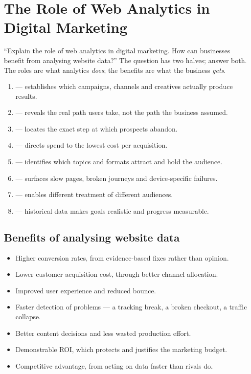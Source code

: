 \documentclass{MMTextbook}
\begin{document}
\section{The Role of Web Analytics in Digital Marketing}

\begin{keybox}
``Explain the role of web analytics in digital marketing. How can businesses
benefit from analysing website data?''
The question has two halves; answer both. The roles are what analytics
\emph{does}; the benefits are what the business \emph{gets}.
\end{keybox}

\begin{enumerate}
\item {} --- establishes which campaigns,
      channels and creatives actually produce results.
\item {} --- reveals the real path users
      take, not the path the business assumed.
\item {} --- locates the exact step at which
      prospects abandon.
\item {} --- directs spend to the lowest cost per
      acquisition.
\item {} --- identifies which topics and formats attract and
      hold the audience.
\item {} --- surfaces slow pages, broken journeys and
      device-specific failures.
\item {} --- enables different treatment of
      different audiences.
\item {} --- historical data makes goals
      realistic and progress measurable.
\end{enumerate}

\subsection{Benefits of analysing website data}

\begin{itemize}
\item Higher conversion rates, from evidence-based fixes rather than opinion.
\item Lower customer acquisition cost, through better channel allocation.
\item Improved user experience and reduced bounce.
\item Faster detection of problems --- a tracking break, a broken checkout, a
      traffic collapse.
\item Better content decisions and less wasted production effort.
\item Demonstrable ROI, which protects and justifies the marketing budget.
\item Competitive advantage, from acting on data faster than rivals do.
\end{itemize}
\end{document}
